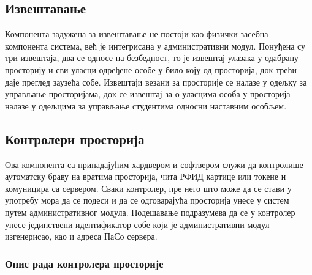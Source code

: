 \documentclass[a4paper, 12pt, diplomski]{etfcyr}
\begin{document}
			\subsection{Извештавање}
				\begin{justify}
					Компонента задужена за извештавање не постоји као физички засебна компонента система, већ је интегрисана у административни модул. Понуђена су три извештаја, два се односе на безбедност, то је извештај улазака у одабрану просторију и сви уласци одређене особе у било коју од просторија, док трећи даје преглед заузећа собе. Извештаји везани за просторије се налазе у одељку за управљање просторијама, док се извештај за о уласцима особа у просторија налазе у одељцима за управљање студентима односни наставним особљем.
				\end{justify}

			\subsection{Контролери просторија}
				\begin{justify}
					Ова компонента са припадајућим хардвером и софтвером служи да контролише аутоматску браву на вратима просторија, чита РФИД картице или токене и комуницира са сервером.
					Сваки контролер, пре него што може да се стави у употребу мора да се подеси и да се одговарајућа просторија унесе у систем путем административног модула. Подешавање подразумева да се у контролер унесе јединствени идентификатор собе који је административни модул изгенерисао, као и адреса ПаСо сервера.
				\end{justify}

				\subsubsection*{Опис рада контролера просторије}
\end{document}
